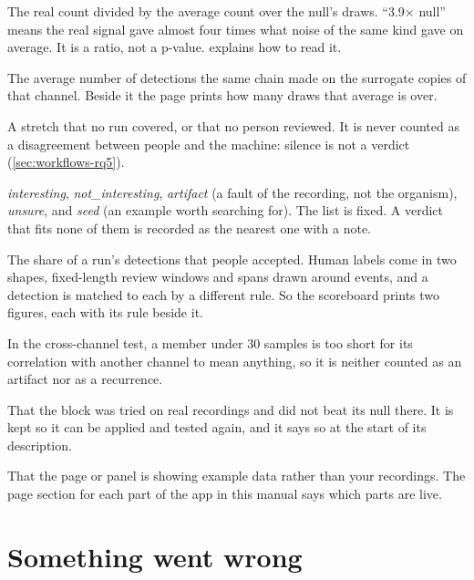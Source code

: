 The real count divided by the average count over the null's draws. ``3.9× null'' means the
real signal gave almost four times what noise of the same kind gave on average. It is a ratio,
not a p-value.  explains how to read it.

The average number of detections the same chain made on the surrogate copies of that channel.
Beside it the page prints how many draws that average is over.

A stretch that no run covered, or that no person reviewed. It is never counted as a
disagreement between people and the machine: silence is not a verdict
(\cref{sec:workflows-rq5}).

\emph{interesting}, \emph{not\_interesting}, \emph{artifact} (a fault of the recording, not
the organism), \emph{unsure}, and \emph{seed} (an example worth searching for). The list is
fixed. A verdict that fits none of them is recorded as the nearest one with a note.

The share of a run's detections that people accepted. Human labels come in two shapes,
fixed-length review windows and spans drawn around events, and a detection is matched to each
by a different rule. So the scoreboard prints two figures, each with its rule beside it.

In the cross-channel test, a member under 30 samples is too short for its correlation with
another channel to mean anything, so it is neither counted as an artifact nor as a recurrence.

That the block was tried on real recordings and did not beat its null there. It is kept so it
can be applied and tested again, and it says so at the start of its description.

That the page or panel is showing example data rather than your recordings. The page section
for each part of the app in this manual says which parts are live.

\section{Something went wrong}\label{sec:faq-wrong}

